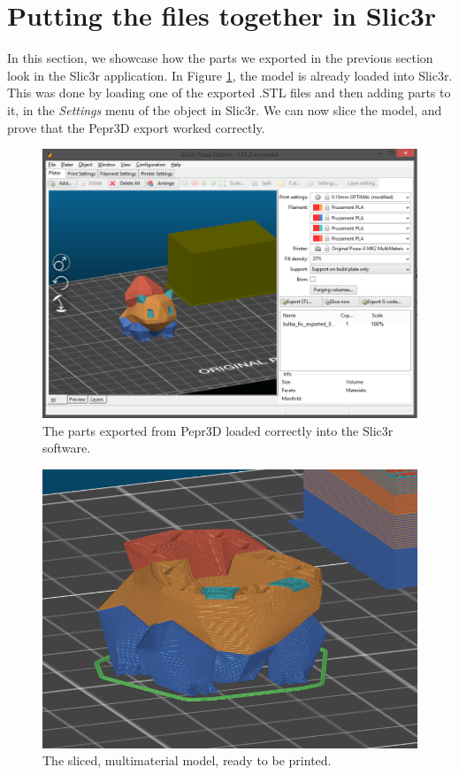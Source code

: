 \section{Putting the files together in Slic3r}

In this section, we showcase how the parts we exported in the previous section look in the Slic3r application. In Figure \ref{fig:slicer}, the model is already loaded into Slic3r. This was done by loading one of the exported .STL files and then adding parts to it, in the \textit{Settings} menu of the object in Slic3r. We can now slice the model, and prove that the Pepr3D export worked correctly.

\begin{figure}
	\centering
	\includegraphics[scale=0.5]{images/slicer.png}
	\caption{The parts exported from Pepr3D loaded correctly into the Slic3r software.}
	\label{fig:slicer}
\end{figure}

\begin{figure}
	\centering
	\includegraphics[scale=0.6]{images/sliced.png}
	\caption{The sliced, multimaterial model, ready to be printed.}
	\label{fig:sliced}
\end{figure}

